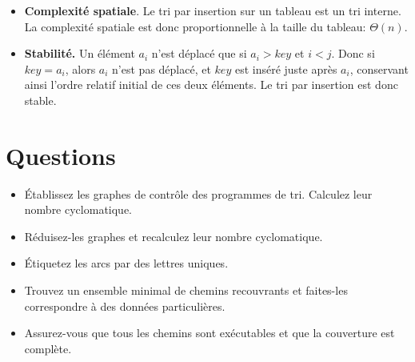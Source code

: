 \documentclass[11pt,a4paper]{article}
\begin{document}
\begin{itemize}
          $$\sum_{j=2}^{n}{\sum_{i=1}^{j-1}{1}} = \frac{n (n-1)}{2}
            = O (n^2)$$

          Lorsque le tableau est déjà trié, nous sommes dans le
          meilleur des cas. Le nombre de comparaisons est alors:

          $$\sum_{j=2}^{n}{1} = n-1$$

    \item \textbf{Complexité spatiale}. Le tri par insertion sur un
          tableau est un tri interne. La complexité spatiale est donc
          proportionnelle à la taille du tableau: $\Theta (n)$.

    \item \textbf{Stabilité.} Un élément $a_i$ n'est déplacé que si
          $a_i > \textit{key}$ et $i < j$. Donc si $\textit{key} =
          a_i$, alors $a_i$ n'est pas déplacé, et $\textit{key}$ est
          inséré juste après $a_i$, conservant ainsi l'ordre relatif
          initial de ces deux éléments. Le tri par insertion est donc
          stable.

  \end{itemize}


\section{Questions}

  \begin{itemize}

     \item Établissez les graphes de contrôle des programmes de
           tri. Calculez leur nombre cyclomatique.

     \item Réduisez-les graphes et recalculez leur nombre
           cyclomatique.

     \item Étiquetez les arcs par des lettres uniques.

     \item Trouvez un ensemble minimal de chemins recouvrants et
           faites-les correspondre à des données particulières.

     \item Assurez-vous que tous les chemins sont exécutables et
           que la couverture est complète.

   \end{itemize}
\end{document}

